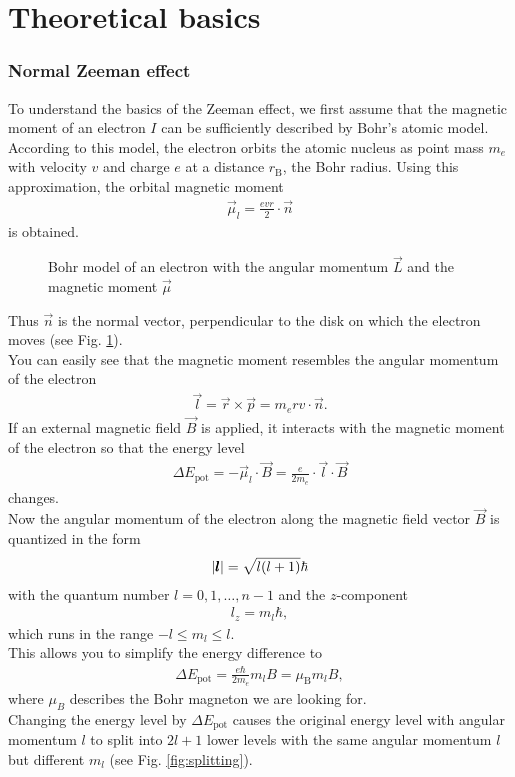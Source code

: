 \section{Theoretical basics}
\subsubsection{Normal Zeeman effect}
To understand the basics of the Zeeman effect, we first assume that the magnetic moment of an electron $I$ can be sufficiently described by Bohr's atomic model.\\
According to this model, the electron orbits the atomic nucleus as point mass $m_e$ with velocity $v$ and charge $e$ at a distance $r_\text{B}$, the Bohr radius.
Using this approximation, the orbital magnetic moment
\begin{align}
\vec{\mu}_l = \frac{evr}{2}\cdot\vec{n}
\end{align}
is obtained.

\begin{figure}[ht]
\centering

\caption{Bohr model of an electron with the angular momentum $\vec{L}$ and the magnetic moment $\vec{\mu}$}
\label{fig:bohrangular}
\end{figure}

Thus $\vec{n}$ is the normal vector, perpendicular to the disk on which the electron moves (see Fig. \ref{fig:bohrangular}).\\
You can easily see that the magnetic moment resembles the angular momentum of the electron
\begin{align}
\vec{l} = \vec{r} \times \vec{p} = m_e r v \cdot \vec{n}.
\end{align}
If an external magnetic field $\vec{B}$ is applied, it interacts with the magnetic moment of the electron so that the energy level
\begin{align}
\Delta E_\text{pot} = -\vec{\mu}_l \cdot \vec{B} = \frac{e}{2m_e} \cdot \vec{l} \cdot \vec{B}
\end{align}
changes.\\
Now the angular momentum of the electron along the magnetic field vector $\vec{B}$ is quantized in the form
\begin{align}
\abs{\pmb{l}} = \sqrt{l(l+1)}\hbar
\end{align}
with the quantum number $l = 0, 1,…, n-1$ and the $z$-component
\begin{align}
l_z = m_l \hbar,
\end{align}
which runs in the range $-l \leq m_l \leq l$.\\
This allows you to simplify the energy difference to
\begin{align}
\Delta E_\text{pot} = \frac{e \hbar}{2 m_e} m_l B = \mu_\text{B} m_l B,
\label{eq:energydiff}
\end{align}
where $\mu_B$ describes the Bohr magneton we are looking for.\\
Changing the energy level by $\Delta E_\text{pot}$ causes the original energy level with angular momentum $l$ to split into $2l+1$ lower levels with the same angular momentum $l$ but different $m_l$ (see Fig. \ref{fig:splitting}).\\

